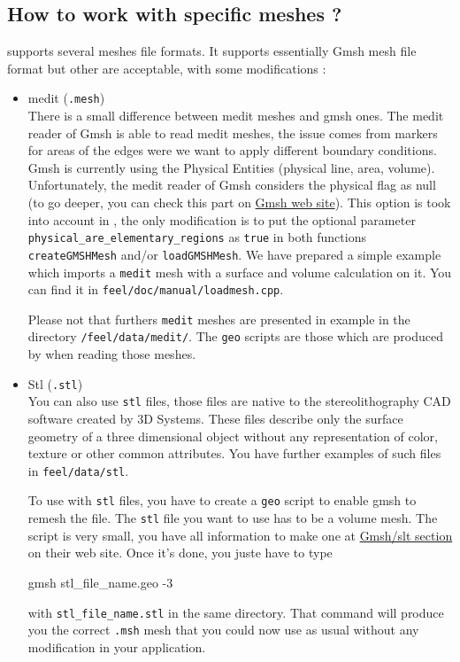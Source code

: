 %

\subsection{How to work with specific meshes ?}
\label{howto:spec-meshes}
\feel supports several meshes file formats. It supports essentially Gmsh mesh file format but other are acceptable,  with some modifications :
\begin{itemize}

\item medit (\lstinline!.mesh!) \\
There is a small difference between medit meshes and gmsh ones. The medit reader of Gmsh is able to read medit meshes, the issue comes from markers for areas of the edges were we want to apply different boundary conditions. Gmsh is currently using the Physical Entities (physical line, area, volume). Unfortunately, the medit reader of Gmsh considers the physical flag as null (to go deeper, you can check this part on \href{http://geuz.org/gmsh/doc/texinfo/gmsh.html#Elementary-vs-physical-entities}{Gmsh web site}). This option is took into account in \feel, the only modification is to put the optional parameter \lstinline!physical_are_elementary_regions! as \lstinline!true! in both functions \lstinline!createGMSHMesh! and/or \lstinline!loadGMSHMesh!. We have prepared a simple example which imports a \lstinline!medit! mesh with a surface and volume calculation on it. You can find it in \lstinline!feel/doc/manual/loadmesh.cpp!.

Please not that furthers \lstinline!medit! meshes are presented in example in the directory \lstinline!/feel/data/medit/!. The \lstinline!geo! scripts are those which are produced by \feel when reading those meshes.

\item Stl (\lstinline!.stl!) \\
You can also use \lstinline!stl! files, those files are native to the stereolithography CAD software created by 3D Systems. These files describe only the surface geometry of a three dimensional object without any representation of color, texture or other common attributes. You have further examples of such files in \lstinline!feel/data/stl!.

To use \feel with \lstinline!stl! files, you have to create a \lstinline!geo! script to enable gmsh to remesh the file. The \lstinline!stl! file you want to use has to be a volume mesh. The script is very small, you have all information to make one at \href{https://geuz.org/trac/gmsh/wiki/STLRemeshing}{Gmsh/slt section} on their web site. Once it's done, you juste have to type
\begin{unixcom}
		gmsh stl_file_name.geo -3
\end{unixcom}
with \lstinline!stl_file_name.stl! in the same directory. That command will produce you the correct \lstinline!.msh! mesh that you could now use as usual without any modification in your \feel application.


\end{itemize}
